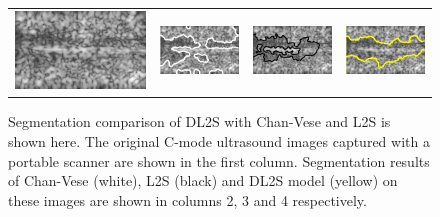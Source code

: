 \begin{figure}[t]
\begin{tabular}{@{}cccc@{}}
		\\		
		\includegraphics[width=.23\linewidth]{./images/DL2S/compare/vessINVIVO17_orig} &
		\includegraphics[width=.23\linewidth]{./images/DL2S/compare/vessINVIVO17_CV}   &
		\includegraphics[width=.23\linewidth]{./images/DL2S/compare/vessINVIVO17_L2S_p2_c} & 
		\includegraphics[width=.23\linewidth]{./images/DL2S/compare/vessINVIVO17_DL} 
	\end{tabular}
\caption[Qualitative comparison of DL2S]{Segmentation comparison of DL2S with Chan-Vese and L2S is shown here. The original C-mode ultrasound images captured with a portable scanner are shown in the first column. Segmentation results of Chan-Vese (white), L2S (black) and DL2S model (yellow) on these images are shown in columns 2, 3 and 4 respectively.}
\label{fig:seg_comp}
\end{figure}

